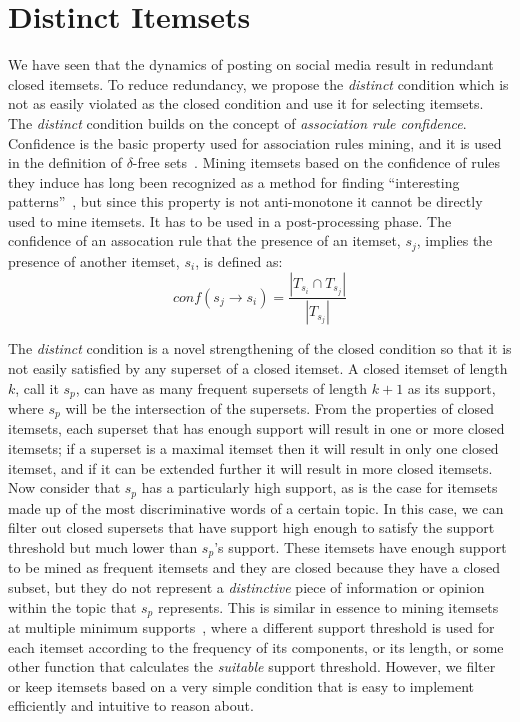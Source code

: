 \documentclass[letterpaper,12pt,titlepage,oneside,final]{book}
\begin{document}
\section{Distinct Itemsets}

We have seen that the dynamics of posting on social media result in redundant closed itemsets.
To reduce redundancy, we propose the \emph{distinct} condition which is not as easily violated 
as the closed condition and use it for selecting itemsets.
The \emph{distinct} condition builds on the concept of \emph{association rule confidence}.
Confidence is the basic property used for association rules mining,
and it is used in the definition of $\delta$-free sets~\cite{boulicaut2003free}.
Mining itemsets based on the confidence of rules they induce has long been
recognized as a method for finding
``interesting patterns''~\cite{cohen2001finding},
but since this property is not anti-monotone it cannot be directly used
to mine itemsets. It has to be used in a post-processing phase.
The confidence of an assocation rule that the presence of an itemset,
$s_{j}$, implies the presence of another itemset, $s_i$, is  defined as:
\begin{equation}\label{eq:conf}conf(s_j \rightarrow s_i) = \frac{|T_{s_i} \cap T_{s_j}|}{|T_{s_j}|}\end{equation}


The \emph{distinct} condition is a novel strengthening of the closed condition
so that it is not easily satisfied by any superset of a closed itemset.
A closed itemset of length $k$, call it $s_p$, %
can have as many frequent supersets of length $k+1$ as its support, %
where $s_p$ will be the intersection of the supersets.
From the properties of closed itemsets, 
each superset that has enough support
will result in one or more closed itemsets;
if a superset is a maximal itemset then 
it will result in only one closed itemset,
and if it can be extended further it will 
result in more closed itemsets.
Now consider that $s_p$ has a particularly high support,
as is the case for itemsets made up of the 
most discriminative words of a certain topic.
In this case, we can filter out
closed supersets that have
support high enough to satisfy the support threshold
but much lower than $s_p$'s support.
These itemsets have enough support to be mined as frequent itemsets 
and they are closed because they have a closed subset, 
but they do not represent 
a \emph{distinctive} piece of information or opinion 
within the topic that $s_p$ represents.
This is similar in essence to mining itemsets
at multiple minimum supports~\cite{liu1999mining,seno2005finding,wang2000mining,xiong2003mining}, 
where a different support threshold is used for 
each itemset according to the frequency of its components, or its length, 
or some other function that calculates the \emph{suitable} support threshold.
However, we filter or keep itemsets based on a very simple condition
that is easy to implement efficiently and intuitive to reason about.
\end{document}
